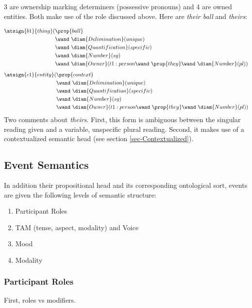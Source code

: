 3 are ownership marking determiners (possessive pronouns) and 4 are owned entities. Both make use of the  role discussed above. Here are \emph{their ball} and \emph{theirs}:
\vspace{-1.5em}

\begin{align*}
\atsign{b1}{thing}(& \prop{ball}  \\ 
      & \wand\ \diam{Delimination}(unique) \\
      & \wand\ \diam{Quantification}(specific) \\
      & \wand\ \diam{Number}(sg) \\
      & \wand\ \diam{Owner}(t1:person \wand\ \prop{they} \wand\ \diam{Number}(pl) ) 
\end{align*}
\begin{align*}
\atsign{c1}{entity}(& \prop{context}  \\ 
      & \wand\ \diam{Delimination}(unique) \\
      & \wand\ \diam{Quantification}(specific) \\
      & \wand\ \diam{Number}(sg) \\
      & \wand\ \diam{Owner}(t1:person \wand\ \prop{they} \wand\ \diam{Number}(pl) ) 
\end{align*}
Two comments about \emph{theirs}. First, this form is ambiguous between the singular reading given and a variable, unspecific plural reading. Second, it makes use of a contextualized semantic head (see section \ref{sec-Contextualized}).

\subsection{Event Semantics}

In addition their propositional head and its corresponding ontological sort, events are given the following levels of semantic structure: 
\begin{enumerate}
\item Participant Roles 
\item TAM (tense, aspect, modality) and Voice
\item Mood
\item Modality
\end{enumerate}
\subsubsection{Participant Roles}

First, roles vs modifiers.

